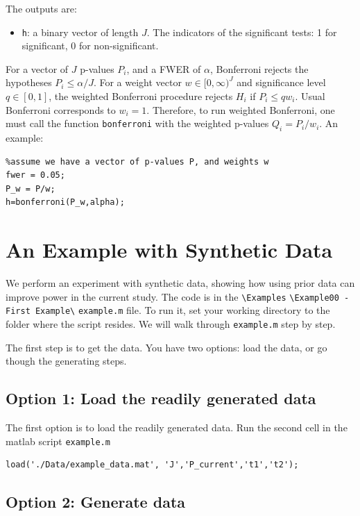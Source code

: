 \documentclass[english,11pt]{article} %
\begin{document}
The outputs are: 
\begin{itemize}
\item \verb+h+:  a binary vector of length $J$. The indicators of the significant tests: 1 for significant, 0 for non-significant.
\end{itemize}

For a vector of $J$ p-values $P_i$, and a FWER of $\alpha$, Bonferroni rejects the hypotheses $P_i \le \alpha/J$. For a weight vector $w \in [0,\infty)^{J}$ and significance level $q \in [0,1]$, the weighted Bonferroni procedure rejects $H_{i}$ if $P_i \le q w_i$. Usual Bonferroni corresponds to $w_i=1$. Therefore, to run weighted Bonferroni, one must call the function \verb+bonferroni+ with the weighted p-values $Q_i = P_i/w_i$. An example:

\begin{verbatim}
%assume we have a vector of p-values P, and weights w
fwer = 0.05;
P_w = P/w;
h=bonferroni(P_w,alpha);
\end{verbatim}


\section{An Example with Synthetic Data}
\label{example}

We perform an experiment with synthetic data, showing how using prior data can improve power in the current study. The code is in the \verb+\Examples+ \verb+\Example00 - First Example\+ \verb+example.m+ file. To run it, set your working directory to the folder where the script resides. We will walk through  \verb+example.m+ step by step.

The first step is to get the data. You have two options: load the data, or go though the generating steps.

\subsection{Option 1: Load the readily generated data}

The first option is to load the readily generated data. Run the second cell in the matlab script \verb+example.m+

\begin{verbatim}
load('./Data/example_data.mat', 'J','P_current','t1','t2');
\end{verbatim}


\subsection{Option 2: Generate data}
\end{document}
